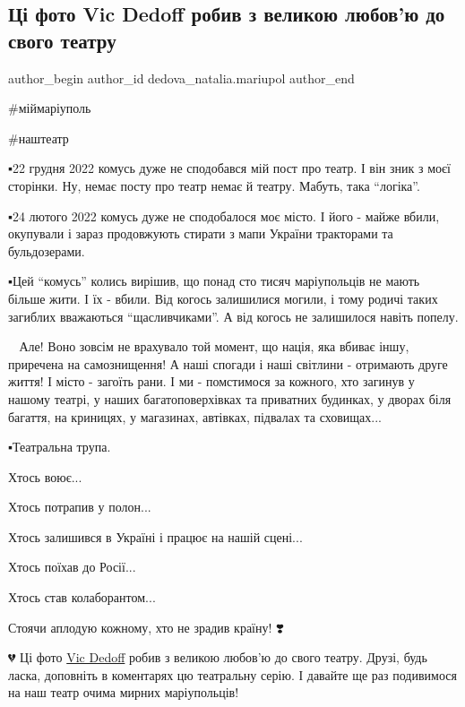  
 
 
 
 

\subsection{Ці фото Vic Dedoff робив з великою любов'ю до свого театру}
\label{sec:23_12_2022.fb.dedova_natalia.mariupol.1.ts__foto_vic_dedoff_}

\ifcmt
 author_begin
   author_id dedova_natalia.mariupol
 author_end
\fi

\#міймаріуполь

\#наштеатр

▪️22 грудня 2022 комусь дуже не сподобався мій пост про театр. І він зник з моєї
сторінки. Ну, немає посту про театр немає й театру. Мабуть, така \enquote{логіка}. 

▪️24 лютого 2022 комусь дуже не сподобалося моє місто. І його - майже вбили,
окупували і зараз продовжують стирати з мапи України тракторами та
бульдозерами. 

▪️Цей \enquote{комусь} колись вирішив, що понад сто тисяч маріупольців не мають більше
жити. І їх - вбили. Від когось залишилися могили, і тому родичі таких загиблих
вважаються \enquote{щасливчиками}. А від когось не залишилося навіть попелу. 

💙💛 Але! Воно зовсім не врахувало той момент, що нація, яка вбиває іншу,
приречена на самознищення! А наші спогади і наші світлини - отримають друге
життя! І місто - загоїть рани. І ми - помстимося за кожного, хто загинув у
нашому театрі, у наших багатоповерхівках та приватних будинках, у дворах біля
багаття, на криницях, у магазинах, автівках, підвалах та сховищах...

▪️Театральна трупа. 

Хтось воює...

Хтось потрапив у полон...

Хтось залишився в Україні і працює на нашій сцені... 

Хтось поїхав до Росії...

Хтось став колаборантом...

Стоячи аплодую кожному, хто не зрадив країну! ❣️

💔 Ці фото \href{https://www.facebook.com/vic.dedoff}{Vic Dedoff} робив з
великою любов'ю до свого театру. Друзі, будь ласка, доповніть в коментарях цю
театральну серію. І давайте ще раз подивимося на наш театр очима мирних
маріупольців!

